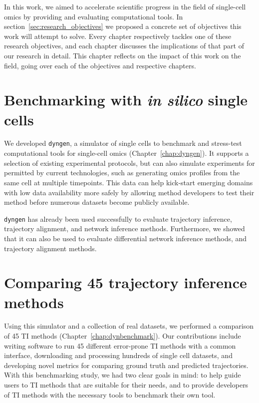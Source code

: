 

In this work, we aimed to accelerate scientific progress in the field of single-cell omics by providing and evaluating computational tools. In section~\ref{sec:research_objectives} we proposed a concrete set of objectives this work will attempt to solve. Every chapter respectively tackles one of these research objectives, and each chapter discusses the implications of that part of our research in detail. This chapter reflects on the impact of this work on the field, going over each of the objectives and respective chapters. 

\section{Benchmarking with \textit{in silico} single cells}

We developed \texttt{dyngen}, a simulator of single cells to benchmark and stress-test computational tools for single-cell omics (Chapter~\ref{chap:dyngen}).
It supports a selection of existing experimental protocols, but can also simulate experiments for permitted by current technologies, such as generating omics profiles from the same cell at multiple timepoints.
This data can help kick-start emerging domains with low data availability more safely by allowing method developers to test their method before numerous datasets become publicly available.

\texttt{dyngen} has already been used successfully to evaluate trajectory inference\cite{saelens_comparisonsinglecelltrajectory_2019}, trajectory alignment\cite{vandenberge_trajectorybaseddifferentialexpression_2019}, and network inference\cite{pratapa_benchmarkingalgorithmsgene_2019} methods. Furthermore, we showed that it can also be used to evaluate differential network inference methods, and trajectory alignment methods.


\section{Comparing 45 trajectory inference methods}
Using this simulator and a collection of real datasets, we performed a comparison of 45 TI methods (Chapter~\ref{chap:dynbenchmark}).
Our contributions include writing software to run 45 different error-prone TI methods with a common interface, downloading and processing hundreds of single cell datasets, and developing novel metrics for comparing ground truth and predicted trajectories.
With this benchmarking study, we had two clear goals in mind: to help guide users to TI methods that are suitable for their needs, and to provide developers of TI methods with the necessary tools to benchmark their own tool.

